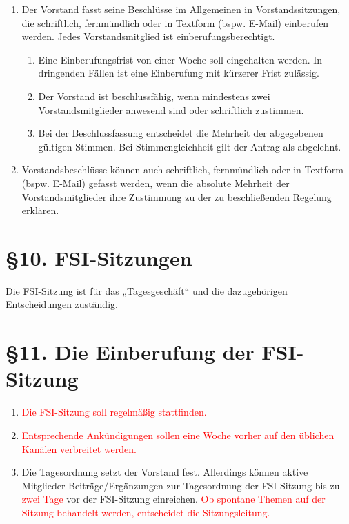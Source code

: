 \documentclass[a4paper,12pt]{article}
\newcommand{\red}[1]{\textcolor{red}{#1}}
\begin{document}
\begin{enumerate}
    	\item
		Der Vorstand fasst seine Beschlüsse im Allgemeinen in
		Vorstandssitzungen, die schriftlich, fernmündlich oder in
		Textform (bspw. E-Mail) einberufen werden. Jedes
		Vorstandsmitglied ist einberufungsberechtigt.
    		\begin{enumerate}[label=(\roman*)]
			\item
				Eine Einberufungsfrist von einer Woche soll
				eingehalten werden. In dringenden Fällen ist
				eine Einberufung mit kürzerer Frist zulässig.
			\item
				Der Vorstand ist beschlussfähig, wenn
				mindestens zwei Vorstandsmitglieder anwesend
				sind oder schriftlich zustimmen.
			\item
				Bei der Beschlussfassung entscheidet die
				Mehrheit der abgegebenen gültigen Stimmen. Bei
				Stimmengleichheit gilt der Antrag als abgelehnt.
    		\end{enumerate}
	\item
		Vorstandsbeschlüsse können auch schriftlich, fernmündlich oder
		in Textform (bspw. E-Mail) gefasst werden, wenn die absolute
		Mehrheit der Vorstandsmitglieder ihre Zustimmung zu der zu
		beschließenden Regelung erklären.
\end{enumerate}

\section*{§10. FSI-Sitzungen}

	Die FSI-Sitzung ist für das „Tagesgeschäft“ und die
	dazugehörigen Entscheidungen zuständig.


\section*{§11. Die Einberufung der FSI-Sitzung}

\begin{enumerate}
	\item
		\red{Die FSI-Sitzung soll regelmäßig stattfinden.}
	\item
		\red{Entsprechende Ankündigungen sollen eine Woche vorher auf den
		üblichen Kanälen verbreitet werden.}
    	\item
		Die Tagesordnung setzt der Vorstand fest. Allerdings können
		aktive Mitglieder Beiträge/Ergänzungen zur Tagesordnung der
		FSI-Sitzung bis zu \red{zwei Tage} vor der
		FSI-Sitzung einreichen. \red{Ob spontane Themen auf der
		Sitzung behandelt werden, entscheidet die Sitzungsleitung.}
\end{enumerate}
\end{document}
